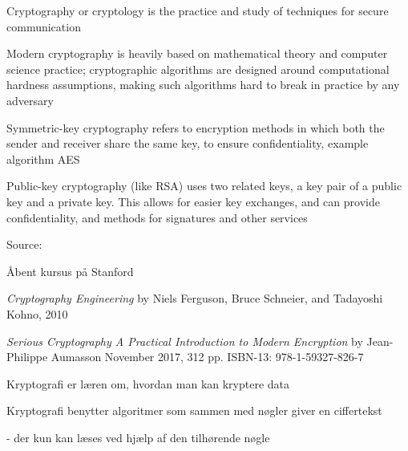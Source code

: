 \documentclass[Screen16to9,17pt]{foils}
\begin{document}

\begin{list1}
\item Cryptography or cryptology is the practice and study of techniques for secure communication
\item Modern cryptography is heavily based on mathematical theory and computer science practice; cryptographic algorithms are designed around computational hardness assumptions, making such algorithms hard to break in practice by any adversary
\item Symmetric-key cryptography refers to encryption methods in which both the sender and receiver share the same key, to ensure confidentiality, example algorithm AES
\item Public-key cryptography (like RSA) uses two related keys, a key pair of a public key and a private key. This allows for easier key exchanges, and can provide confidentiality, and methods for signatures and other services
\end{list1}

Source: 




Åbent kursus på Stanford\\



\emph{Cryptography Engineering} by
Niels Ferguson, Bruce Schneier, and Tadayoshi Kohno, 2010\\





\emph{Serious Cryptography
A Practical Introduction to Modern Encryption}
by Jean-Philippe Aumasson
November 2017, 312 pp.
ISBN-13:
978-1-59327-826-7




\begin{list1}
\item Kryptografi er læren om, hvordan man kan kryptere data
\item Kryptografi benytter algoritmer som sammen med nøgler giver en
  ciffertekst
\item  - der kun kan læses ved hjælp af den tilhørende nøgle
\end{list1}
\end{document}
